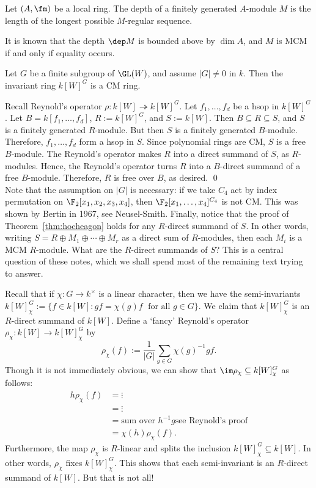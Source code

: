 \begin{dfn}[Depth]
Let $(A,\fm)$ be a local ring. The depth of a finitely generated $A$-module $M$ is the length of the longest possible $M$-regular sequence.
\end{dfn}


It is known that the depth $\dep M$ is bounded above by $\dim A$, and $M$ is MCM if and only if equality occurs. 


\begin{thm} \label{thm:hocheagon}
Let $G$ be a finite subgroup of $\GL(W)$, and assume $|G| \neq 0$ in $k$. Then the invariant ring $k[W]^G$ is a CM ring. 
\end{thm}

\pf Recall Reynold's operator $\rho: k[W]  \twoheadrightarrow k[W]^G$. Let $f_1,\ldots,f_d$ be a hsop in $k[W]^G$. Let $B= k[f_1,\ldots,f_d]$, $R:= k[W]^G$, and $S:= k[W]$.  Then $B \subseteq R \subseteq S$, and $S$ is a finitely generated $R$-module. But then $S$ is a finitely generated $B$-module. Therefore, $f_1,\ldots,f_d$ form a hsop in $S$. Since polynomial rings are CM, $S$ is a free $B$-module. The Reynold's operator makes $R$ into a direct summand of $S$, as $R$-modules. Hence, the Reynold's operator turns $R$ into a $B$-direct summand of a free $B$-module. Therefore, $R$ is free over $B$, as desired. \qed \\


Note that the assumption on $|G|$ is necessary: if we take $C_4$ act by index permutation on $\F_2[x_1,x_2,x_3,x_4]$, then $\F_2[x_1,\ldots,x_4]^{C_4}$ is not CM. This was shown by Bertin in 1967, see Neusel-Smith. Finally, notice that the proof of Theorem~\ref{thm:hocheagon} holds for any $R$-direct summand of $S$. In other words, writing $S= R \oplus M_1 \oplus \cdots \oplus M_r$ as a direct sum of $R$-modules, then each $M_i$ is a MCM $R$-module. What are the $R$-direct summands of $S$? This is a central question of these notes, which we shall spend most of the remaining text trying to answer. 


Recall that if $\chi: G \to k^\times$ is a linear character, then we have the semi-invariants $k[W]^G_\chi:= \{ f \in k[W] \colon gf= \chi(g)f \; \text{ for all } g \in G\}$. We claim that $k[W]^G_\chi$ is an $R$-direct summand of $k[W]$. Define a `fancy' Reynold's operator $\rho_\chi: k[W] \to k[W]^G_\chi$ by 
	\[
	\rho_\chi(f):= \dfrac{1}{|G|} \sum_{g \in G} \chi(g)^{-1} gf.
	\]
Though it is not immediately obvious, we can show that $\im \rho_\chi \subseteq k[W]^G_\chi$ as follows:
	\[
	\begin{split}
	h \rho_\chi(f)&= \vdots \\
	&= \vdots \\
	&= \text{sum over } h^{-1}g \text{see Reynold's proof} \\
	&= \chi(h) \rho_\chi(f).
	\end{split}
	\]
Furthermore, the map $\rho_\chi$ is $R$-linear and splits the inclusion $k[W]^G_\chi \subseteq k[W]$. In other words, $\rho_\chi$ fixes $k[W]^G_\chi$. This shows that each semi-invariant is an $R$-direct summand of $k[W]$. But that is not all! 



